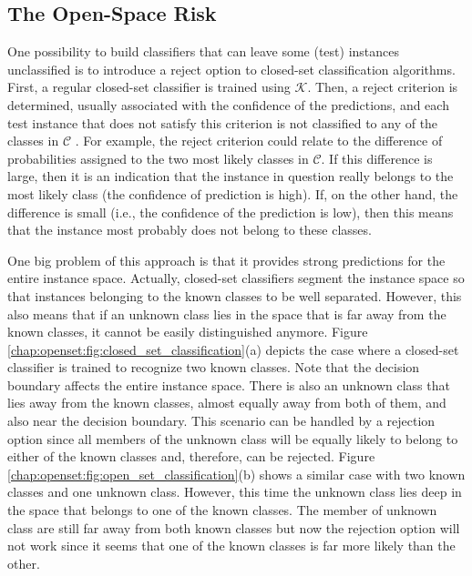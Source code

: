 \subsection{The Open-Space Risk}
\label{chap:openset:sec:open_space_risk}

One possibility to build classifiers that can leave some (test) instances unclassified is to introduce a reject option to closed-set classification algorithms. First, a regular closed-set classifier is trained using $\mathcal{K}$. Then, a reject criterion is determined, usually associated with the confidence of the predictions, and each test instance that does not satisfy this criterion is not classified to any of the classes in $\mathcal{C}$ \parencite{onan2018ensemble}. For example, the reject criterion could relate to the difference of probabilities assigned to the two most likely classes in $\mathcal{C}$. If this difference is large, then it is an indication that the instance in question really belongs to the most likely class (the confidence of prediction is high). If, on the other hand, the difference is small (i.e., the confidence of the prediction is low), then this means that the instance most probably does not belong to these classes. 

One big problem of this approach is that it provides strong predictions for the entire instance space. Actually, closed-set classifiers segment the instance space so that instances belonging to the known classes to be well separated. However, this also means that if an unknown class lies in the space that is far away from the known classes, it cannot be easily distinguished anymore. Figure \ref{chap:openset:fig:closed_set_classification}(a) depicts the case where a closed-set classifier is trained to recognize two known classes. Note that the decision boundary affects the entire instance space. There is also an unknown class that lies away from the known classes, almost equally away from both of them, and also near the decision boundary. This scenario can be handled by a rejection option since all members of the unknown class will be equally likely to belong to either of the known classes and, therefore, can be rejected. Figure \ref{chap:openset:fig:open_set_classification}(b) shows a similar case with two known classes and one unknown class. However, this time the unknown class lies deep in the space that belongs to one of the known classes. The member of unknown class are still far away from both known classes but now the rejection option will not work since it seems that one of the known classes is far more likely than the other. 

